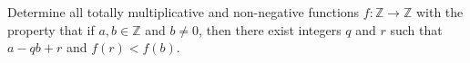 Determine all totally multiplicative and non-negative functions $f\colon\mathbb{Z}\rightarrow \mathbb{Z}$ with the property that if $a, b\in \mathbb{Z}$ and $b\neq 0$, then there exist integers $q$ and $r$ such that $a-qb+r$ and $f(r)<f(b)$.